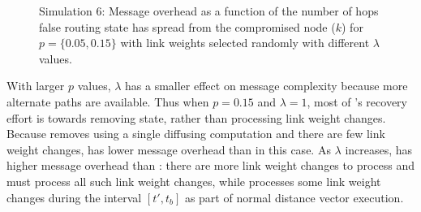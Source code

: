 \begin{figure}
\caption{Simulation 6: Message overhead as a function of the number of hops false routing state has spread from the compromised node ($k$) for $p=\{0.05,0.15\}$ \er with 
link weights selected randomly with different $\lambda$ values.}
\label{fig:lc}
\end{figure}


With larger $p$ values, $\lambda$ has a smaller effect on message complexity because more alternate paths are available. Thus when $p=0.15$ and $\lambda=1$,
most of \purges's recovery effort is towards removing \badvector state, rather than processing link weight changes.  Because
\cpr removes \badvector using a single diffusing computation and there are few link weight changes, \cpr has lower message overhead than \purge in this case. 
As $\lambda$ increases, \cpr has higher message overhead than \purges: there are more link weight changes to process and \cpr must process all such link weight changes, 
while \purge processes some link weight changes during the interval $[t',t_b]$ as part of normal distance vector execution. 

